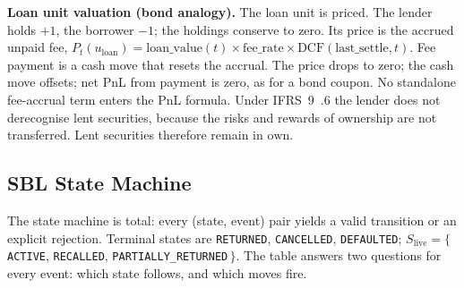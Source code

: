 \noindent\textbf{Loan unit valuation (bond analogy).} The loan unit is priced. The lender holds $+1$, the borrower $-1$; the holdings conserve to zero. Its price is the accrued unpaid fee, $P_t(u_{\mathrm{loan}}) = \mathrm{loan\_value}(t)\times\mathrm{fee\_rate}\times\mathrm{DCF}(\mathrm{last\_settle},t)$. Fee payment is a cash move that resets the accrual. The price drops to zero; the cash move offsets; net PnL from payment is zero, as for a bond coupon. No standalone fee-accrual term enters the PnL formula. Under IFRS~9~.6 the lender does not derecognise lent securities, because the risks and rewards of ownership are not transferred. Lent securities therefore remain in $\mathrm{own}$.

\subsection{SBL State Machine}
\label{sec:sbl-state-machine}

The state machine is total: every (state, event) pair yields a valid transition or an explicit rejection. Terminal states are \texttt{RETURNED}, \texttt{CANCELLED}, \texttt{DEFAULTED}; $S_{\mathrm{live}} = \{\,$\texttt{ACTIVE}, \texttt{RECALLED}, \texttt{PARTIALLY\_RETURNED}$\,\}$. The table answers two questions for every event: which state follows, and which moves fire.

